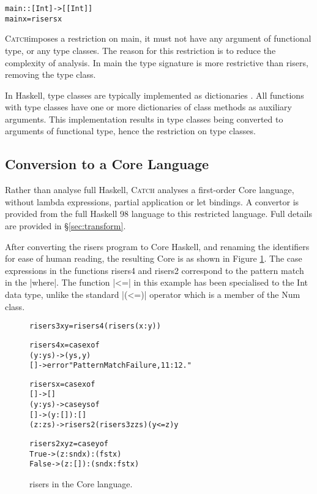 \documentclass[preprint]{sigplanconf}
\newcommand{\C}[1]{\textsf{#1}}
\newcommand{\catch}{\textsc{Catch}}
\newenvironment{code}{\begin{alltt}\small}{\end{alltt}}
\begin{document}
\begin{code}
main :: [Int] -> [[Int]]
main x = risers x
\end{code}

\catch imposes a restriction on \C{main}, it must not have any argument of functional type, or any type classes. The reason for this restriction is to reduce the complexity of analysis. In \C{main} the type signature is more restrictive than \C{risers}, removing the type class.

In Haskell, type classes are typically implemented as dictionaries \citep{wadler:type_classes}. All functions with type classes have one or more dictionaries of class methods as auxiliary arguments. This implementation results in type classes being converted to arguments of functional type, hence the restriction on type classes.

\subsection{Conversion to a Core Language}

Rather than analyse full Haskell, \catch{} analyses a first-order Core language, without lambda expressions, partial application or let bindings. A convertor is provided from the full Haskell 98 language to this restricted language. Full details are provided in \S\ref{sec:transform}.

After converting the \C{risers} program to Core Haskell, and renaming the identifiers for ease of human reading, the resulting Core is as shown in Figure \ref{fig:risers_core}. The case expressions in the functions \C{risers4} and \C{risers2} correspond to the pattern match in the |where|. The function |<=| in this example has been specialised to the Int data type, unlike the standard |(<=)| operator which is a member of the \C{Num} class.

\begin{figure}
\begin{code}
risers3 x y = risers4 (risers (x : y))

risers4 x = case x of
    (y:ys) -> (ys, y)
    [] -> error "Pattern Match Failure, 11:12."

risers x = case x of
    [] -> []
    (y:ys) ->  case ys of
         [] -> (y : []) : []
         (z:zs) -> risers2 (risers3 z zs) (y <= z) y

risers2 x y z =  case y of
    True -> (z : snd x) : (fst x)
    False -> (z : []) : (snd x : fst x)
\end{code}
\caption{\C{risers} in the Core language.}
\label{fig:risers_core}
\end{figure}
\end{document}
